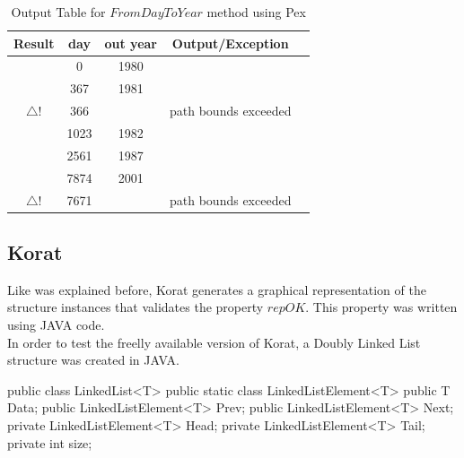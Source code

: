 \documentclass[a4paper,UKenglish]{oasics}
\newcommand{\checkK}{\color{green}\checkmark}
\newcommand{\bigexclaim}{\color{yellow}$\bigtriangleup$\hspace{-5.6pt}!}
\begin{document}
\begin{table}[!ht]
\renewcommand{\arraystretch}{1.3}
\caption{Output Table for $FromDayToYear$ method using Pex}
\label{tab:leap}
\centering
\noindent \begin{tabular}{|c|c|c|c|c|}\hline
Result & day & out year & Output/Exception\\\hline
\checkK & 0 & 1980 & \\\hline
\checkK & 367 & 1981 & \\\hline
\bigexclaim & 366 & & path bounds exceeded\\\hline
\checkK & 1023 & 1982 &\\\hline
\checkK & 2561 & 1987 & \\\hline
\checkK & 7874 & 2001 & \\\hline
\bigexclaim &  7671 & & path bounds exceeded\\\hline
\end{tabular}
\end{table}

\subsection{Korat}
Like was explained before, Korat generates a graphical representation of the structure instances that validates the property $repOK$. This property was written using JAVA code.\\
In order to test the freelly available version of Korat, a Doubly Linked List structure was created in JAVA.

\begin{code}
public class LinkedList<T> {
  public static class LinkedListElement<T> {
    public T Data;
    public LinkedListElement<T> Prev;
    public LinkedListElement<T> Next;
  }
  private LinkedListElement<T> Head;
  private LinkedListElement<T> Tail;
  private int size; 
}
\end{code}

\def\t#1#2#3#4{\langle#1 \ #2 : #3 \ : #4 \ \rangle}
\def\d#1#2#3{\langle#1 \ #2 :: #3 \ \rangle}
\newcommand{\subseteqL}{\mathbin{\subseteq\mkern-4mu\subseteq}}
\newcommand{\inL}{\mathbin{\in\mkern-4mu\in}}
\end{document}
